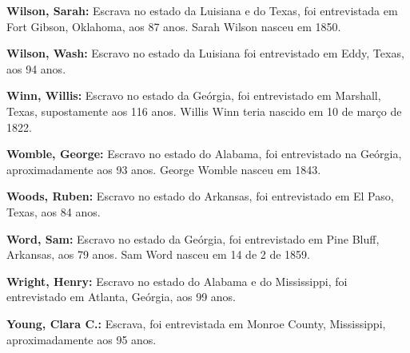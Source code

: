\textbf{Wilson, Sarah:} Escrava no estado da Luisiana e do Texas, foi
entrevistada em Fort Gibson, Oklahoma, aos 87 anos. Sarah Wilson nasceu
em 1850.

\textbf{Wilson, Wash:} Escravo no estado da Luisiana foi entrevistado em
Eddy, Texas, aos 94 anos.

\textbf{Winn, Willis:} Escravo no estado da Geórgia, foi entrevistado em
Marshall, Texas, supostamente aos 116 anos. Willis Winn teria nascido em
10 de março de 1822.

\textbf{Womble, George:} Escravo no estado do Alabama, foi entrevistado
na Geórgia, aproximadamente aos 93 anos. George Womble nasceu em 1843.

\textbf{Woods, Ruben:} Escravo no estado do Arkansas, foi entrevistado
em El Paso, Texas, aos 84 anos.

\textbf{Word, Sam:} Escravo no estado da Geórgia, foi entrevistado em
Pine Bluff, Arkansas, aos 79 anos. Sam Word nasceu em 14 de 2 de 1859.

\textbf{Wright, Henry:} Escravo no estado do Alabama e do Mississippi,
foi entrevistado em Atlanta, Geórgia, aos 99 anos.

\textbf{Young, Clara C.:} Escrava, foi entrevistada em Monroe County,
Mississippi, aproximadamente aos 95 anos.
